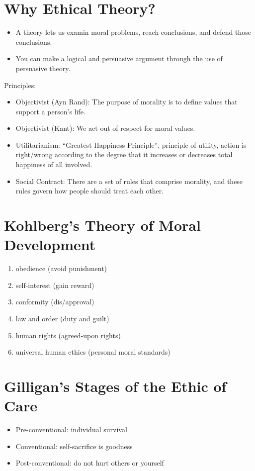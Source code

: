 \documentclass[letterpaper, 12pt]{article}
\begin{document}
\section*{Why Ethical Theory?}
\begin{itemize}
  \item A theory lets us examin moral problems, reach conclusions, and defend
    those conclusions.
  \item You can make a logical and persuasive argument through the use of
    persuasive theory.
\end{itemize}
Principles:
\begin{itemize}
  \item Objectivist (Ayn Rand): The purpose of morality is to define values
    that support a person's life.
  \item Objectivist (Kant): We act out of respect for moral values.
  \item Utilitarianism: ``Greatest Happiness Principle'', principle of utility,
    action is right/wrong according to the degree that it increases or
    decreases total happiness of all involved.
  \item Social Contract: There are a set of rules that comprise morality, and
    these rules govern how people should treat each other.
\end{itemize}

\section*{Kohlberg's Theory of Moral Development}
\begin{enumerate}
  \item obedience (avoid punishment)
  \item self-interest (gain reward)
  \item conformity (dis/approval)
  \item law and order (duty and guilt)
  \item human rights (agreed-upon rights)
  \item universal human ethics (personal moral standards)
\end{enumerate}

\section*{Gilligan's Stages of the Ethic of Care}
\begin{itemize}
  \item Pre-conventional: individual survival
  \item Conventional: self-sacrifice is goodness
  \item Post-conventional: do not hurt others or yourself
\end{itemize}
\end{document}
